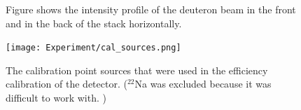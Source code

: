 \begin{figure}%
    \centering
    
    \quad
    \caption{Figure shows the intensity profile of the deuteron beam in the front and in the back of the stack horizontally.}%
    \label{fig:beamprofile}%
\end{figure}


\begin{figure}
    \centering
    \texttt{[image: Experiment/cal\_sources.png]}
    \caption{The calibration point sources that were used in the efficiency calibration of the detector. ($^{22}$Na was excluded because it was difficult to work with. )}
    \label{fig:calsources}
\end{figure}

